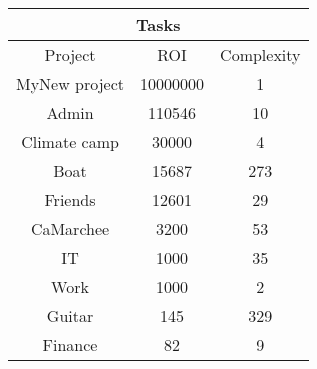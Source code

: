 \begin{longtable}{|c|c|c|}
\hline
\multicolumn{3}{|c|}{Tasks} \\
\hline
Project & ROI & Complexity \\
\hline
MyNew project & 10000000 & 1\\
\hline
Admin & 110546 & 10\\
\hline
Climate camp & 30000 & 4\\
\hline
Boat & 15687 & 273\\
\hline
Friends & 12601 & 29\\
\hline
CaMarchee & 3200 & 53\\
\hline
IT & 1000 & 35\\
\hline
Work & 1000 & 2\\
\hline
Guitar & 145 & 329\\
\hline
Finance & 82 & 9\\
\hline
\end{longtable}
